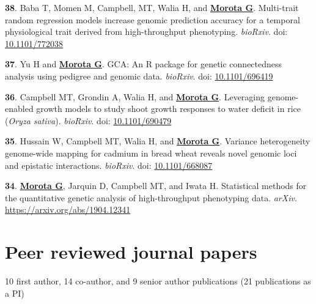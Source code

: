 \documentclass[margin,line,10pt]{res}
\newenvironment{list1}{
  \begin{list}{\ding{113}}{%
      \setlength{\itemsep}{0in}
      \setlength{\parsep}{0in} \setlength{\parskip}{0in}
      \setlength{\topsep}{0in} \setlength{\partopsep}{0in} 
      \setlength{\leftmargin}{0.17in}}}{\end{list}}
\begin{document}
\begin{resume}
\begin{list1}
  \item  [{\bf 38}.] Baba T, Momen M, Campbell, MT, Walia H, and \textbf{\underline{Morota G}}. Multi-trait random regression models increase genomic prediction accuracy for a temporal physiological trait derived from high-throughput phenotyping. \emph{bioRxiv}. doi: \textcolor{blue}{\href{https://doi.org/10.1101/772038}{10.1101/772038}}

    \vspace{0.5cm}
    
   \item  [{\bf 37}.] Yu H and \textbf{\underline{Morota G}}. GCA: An R package for genetic connectedness analysis using pedigree and genomic data. \emph{bioRxiv}.  doi: \textcolor{blue}{\href{https://doi.org/10.1101/696419}{10.1101/696419}}

          \vspace{0.5cm}

   \item  [{\bf 36}.]  Campbell MT, Grondin A, Walia H, and \textbf{\underline{Morota G}}. Leveraging genome-enabled growth models to study shoot growth responses to water deficit in rice ({\it Oryza sativa}). \emph{bioRxiv}.  doi: \textcolor{blue}{\href{https://doi.org/10.1101/690479}{10.1101/690479}}

     \vspace{0.5cm}
     
   \item  [{\bf 35}.]  Hussain W, Campbell MT, Walia H, and \textbf{\underline{Morota G}}. Variance heterogeneity genome-wide mapping for cadmium in bread wheat reveals novel genomic loci and epistatic interactions. \emph{bioRxiv}.  doi: \textcolor{blue}{\href{https://doi.org/10.1101/668087}{10.1101/668087}}

  \vspace{0.5cm}

  
\item  [{\bf 34}.] \textbf{\underline{Morota G}}, Jarquin D, Campbell MT, and Iwata H. Statistical methods for the quantitative genetic analysis of high-throughput phenotyping data. \emph{arXiv}.  \textcolor{blue}{\href{https://arxiv.org/abs/1904.12341}{https://arxiv.org/abs/1904.12341}}

 
\end{list1}

  
\vspace{0.5cm}


\section{\sc Peer reviewed journal papers}
\vspace{0.5cm}
10 first author, 14 co-author, and 9 senior author publications (21 publications as a PI)\\


\end{resume}
\end{document}

